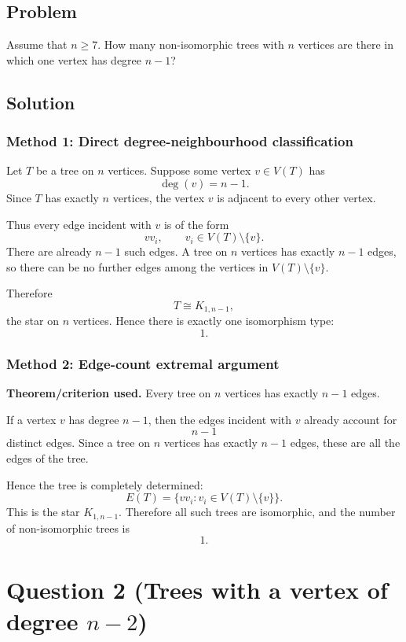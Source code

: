 \documentclass[12pt]{article}
\begin{document}
\subsection{Problem}
Assume that $n\ge 7$. How many non-isomorphic trees with $n$ vertices are there in which one vertex has degree $n-1$?

\subsection{Solution}

\subsubsection{Method 1: Direct degree-neighbourhood classification}
Let $T$ be a tree on $n$ vertices. Suppose some vertex $v\in V(T)$ has
\[
  \deg(v)=n-1.
\]
Since $T$ has exactly $n$ vertices, the vertex $v$ is adjacent to every other vertex.

Thus every edge incident with $v$ is of the form
\[
  vv_i,
  \qquad
  v_i\in V(T)\setminus\{v\}.
\]
There are already $n-1$ such edges. A tree on $n$ vertices has exactly $n-1$ edges, so there can be no further edges among the vertices in $V(T)\setminus\{v\}$.

Therefore
\[
  T\cong K_{1,n-1},
\]
the star on $n$ vertices. Hence there is exactly one isomorphism type:
\[
  \boxed{1}.
\]

\subsubsection{Method 2: Edge-count extremal argument}
\textbf{Theorem/criterion used.} Every tree on $n$ vertices has exactly $n-1$ edges.

If a vertex $v$ has degree $n-1$, then the edges incident with $v$ already account for
\[
  n-1
\]
distinct edges. Since a tree on $n$ vertices has exactly $n-1$ edges, these are all the edges of the tree.

Hence the tree is completely determined:
\[
  E(T)=\{vv_i: v_i\in V(T)\setminus\{v\}\}.
\]
This is the star $K_{1,n-1}$. Therefore all such trees are isomorphic, and the number of non-isomorphic trees is
\[
  \boxed{1}.
\]

\newpage
\section{Question 2 (Trees with a vertex of degree $n-2$)}
\end{document}
